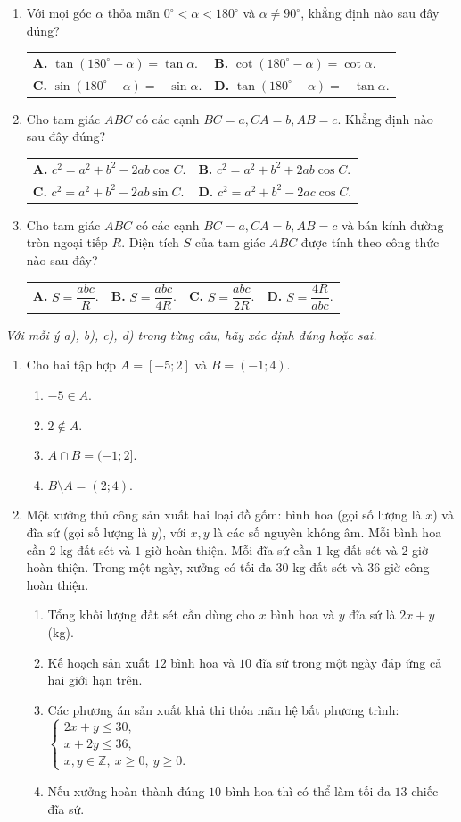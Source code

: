 \documentclass[12pt,a4paper]{article}
\makeatletter
\newcommand{\parttitle}[1]{\par\vspace{3pt}{\large\bfseries\color{ink}#1}\par\vspace{2pt}}
\newcommand{\four}[4]{\par\noindent\begin{tabularx}{\linewidth}{@{}*{4}{>{\raggedright\arraybackslash}X}@{}}\textbf{A.} #1&\textbf{B.} #2&\textbf{C.} #3&\textbf{D.} #4\end{tabularx}}
\newcommand{\two}[4]{\par\noindent\begin{tabularx}{\linewidth}{@{}*{2}{>{\raggedright\arraybackslash}X}@{}}\textbf{A.} #1&\textbf{B.} #2\\[3pt]\textbf{C.} #3&\textbf{D.} #4\end{tabularx}}
\makeatother
\begin{document}
\begin{enumerate}
\four{$\sin\alpha < 0$.}{$\cos\alpha > 0$.}{$\tan\alpha < 0$.}{$\cot\alpha > 0$.}
\item Với mọi góc $\alpha$ thỏa mãn $0^\circ < \alpha < 180^\circ$ và $\alpha \neq 90^\circ$, khẳng định nào sau đây đúng?
\two{$\tan(180^\circ - \alpha) = \tan\alpha$.}{$\cot(180^\circ - \alpha) = \cot\alpha$.}{$\sin(180^\circ - \alpha) = -\sin\alpha$.}{$\tan(180^\circ - \alpha) = -\tan\alpha$.}
\item Cho tam giác $ABC$ có các cạnh $BC = a, CA = b, AB = c$. Khẳng định nào sau đây đúng?
\two{$c^2 = a^2 + b^2 - 2ab\cos C$.}{$c^2 = a^2 + b^2 + 2ab\cos C$.}{$c^2 = a^2 + b^2 - 2ab\sin C$.}{$c^2 = a^2 + b^2 - 2ac\cos C$.}
\item Cho tam giác $ABC$ có các cạnh $BC = a, CA = b, AB = c$ và bán kính đường tròn ngoại tiếp $R$. Diện tích $S$ của tam giác $ABC$ được tính theo công thức nào sau đây?
\four{$S = \dfrac{abc}{R}$.}{$S = \dfrac{abc}{4R}$.}{$S = \dfrac{abc}{2R}$.}{$S = \dfrac{4R}{abc}$.}
\end{enumerate}

\par\vspace{8pt}
\parttitle{PHẦN II. Trắc nghiệm đúng/sai}
\textit{Với mỗi ý a), b), c), d) trong từng câu, hãy xác định đúng hoặc sai.}
\begin{enumerate}
\item Cho hai tập hợp $A = [-5; 2]$ và $B = (-1; 4)$.
\begin{enumerate}
\item $-5 \in A$.
\item $2 \notin A$.
\item $A \cap B = (-1; 2]$.
\item $B \setminus A = (2; 4)$.
\end{enumerate}
\item Một xưởng thủ công sản xuất hai loại đồ gốm: bình hoa (gọi số lượng là $x$) và đĩa sứ (gọi số lượng là $y$), với $x, y$ là các số nguyên không âm. Mỗi bình hoa cần $2\text{ kg}$ đất sét và $1$ giờ hoàn thiện. Mỗi đĩa sứ cần $1\text{ kg}$ đất sét và $2$ giờ hoàn thiện. Trong một ngày, xưởng có tối đa $30\text{ kg}$ đất sét và $36$ giờ công hoàn thiện.
\begin{enumerate}
\item Tổng khối lượng đất sét cần dùng cho $x$ bình hoa và $y$ đĩa sứ là $2x + y$ (kg).
\item Kế hoạch sản xuất $12$ bình hoa và $10$ đĩa sứ trong một ngày đáp ứng cả hai giới hạn trên.
\item Các phương án sản xuất khả thi thỏa mãn hệ bất phương trình:\\
$\begin{cases} 2x + y \leq 30, \\ x + 2y \leq 36, \\ x, y \in \mathbb{Z},\ x \geq 0,\ y \geq 0. \end{cases}$
\item Nếu xưởng hoàn thành đúng $10$ bình hoa thì có thể làm tối đa $13$ chiếc đĩa sứ.
\end{enumerate}
\end{enumerate}
\end{document}
